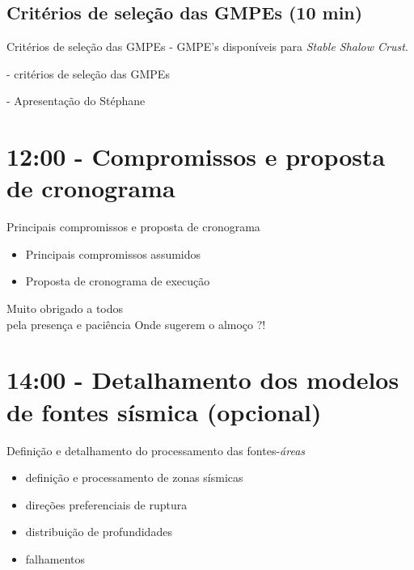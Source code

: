 \documentclass[ucs,8pt]{beamer}
\begin{document}
	\subsection{Critérios de seleção das GMPEs (10 min)}
	\begin{frame}{Critérios de seleção das GMPEs}
		- GMPE's disponíveis para \emph{Stable Shalow Crust}.
	
		- critérios de seleção das GMPEs
		
		- Apresentação do Stéphane
	\end{frame}



\section{12:00 - Compromissos e proposta de cronograma}

	\begin{frame}{Principais compromissos e proposta de cronograma}
		\begin{itemize}
			\item Principais compromissos assumidos
			\item  Proposta de cronograma de execução
		\end{itemize}
	\end{frame}


	\begin{frame}{Muito obrigado a todos \\
				  pela presença e paciência}
		Onde sugerem o almoço ?!
	\end{frame}


\section{14:00 - Detalhamento dos modelos de fontes sísmica (opcional)}
	\begin{frame}{Definição e detalhamento do processamento das fontes-\emph{áreas}}
		\begin{itemize}
			\item definição e processamento de zonas sísmicas
			\item direções preferenciais de ruptura
			\item distribuição de profundidades
			\item falhamentos
		\end{itemize}
	\end{frame}
\end{document}
